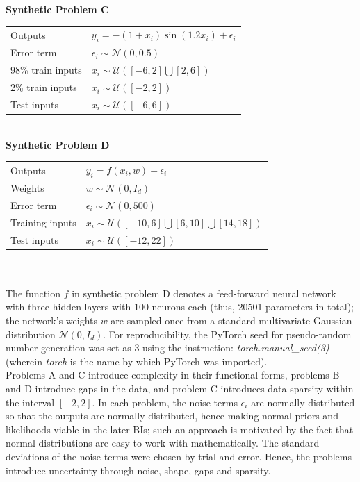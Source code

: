 \documentclass[conference]{IEEEtran}
\begin{document}
\textbf{Synthetic Problem C}

\begin{tabular}{m{2.5cm} | m{6cm}}
    Outputs & $y_i = -(1 + x_i)\sin(1.2x_i) + \epsilon_i$\\
    Error term & $\epsilon_i \sim \mathcal{N}(0, 0.5)$\\
    98\% train inputs & $x_i \sim \mathcal{U}([-6, 2] \bigcup [2, 6])$\\
    2\% train inputs & $x_i \sim \mathcal{U}([-2, 2])$\\
    Test inputs & $x_i \sim \mathcal{U}([-6, 6])$
\end{tabular}\\

\textbf{Synthetic Problem D}

\begin{tabular}{m{2.5cm} | m{6cm}}
    Outputs & $y_i = f(x_i, w) + \epsilon_i$\\
    Weights & $w \sim \mathcal{N}(0, I_d)$\\
    Error term & $\epsilon_i \sim \mathcal{N}(0, 500)$\\
    Training inputs & $x_i \sim \mathcal{U}([-10, 6] \bigcup [6, 10] \bigcup [14, 18])$\\
    Test inputs & $x_i \sim \mathcal{U}([-12, 22])$
\end{tabular}\\~\\

The function $f$ in synthetic problem D denotes a feed-forward neural network with three hidden layers with 100 neurons each (thus, 20501 parameters in total); the network's weights $w$ are sampled once from a standard multivariate Gaussian distribution $\mathcal{N}(0, I_d)$. For reproducibility, the PyTorch seed for pseudo-random number generation was set as $3$ using the instruction: \textit{torch.manual\_seed(3)} (wherein \textit{torch} is the name by which PyTorch was imported).\\

Problems A and C introduce complexity in their functional forms, problems B and D introduce gaps in the data, and problem C introduces data sparsity within the interval $[-2, 2]$. In each problem, the noise terms $\epsilon_i$ are normally distributed so that the outputs are normally distributed, hence making normal priors and likelihoods viable in the later BIs; such an approach is motivated by the fact that normal distributions are easy to work with mathematically. The standard deviations of the noise terms were chosen by trial and error. Hence, the problems introduce uncertainty through noise, shape, gaps and sparsity.\\
\end{document}
